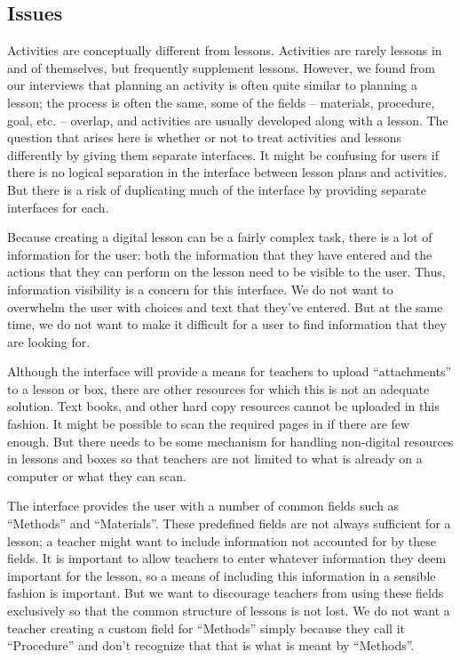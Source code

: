 \documentclass[10pt,letter,titlepage]{article}
\begin{document}
\subsection{Issues}
\label{sec: issues}
Activities are conceptually different from lessons. Activities are rarely
lessons in and of themselves, but frequently supplement lessons. However,
we found from our interviews that planning an activity is often quite similar to
planning a lesson; the process is often the same, some of the fields --
materials, procedure, goal, etc. -- overlap, and activities are usually
developed along with a lesson. The question that arises here is whether or not
to treat activities and lessons differently by giving them separate interfaces.
It might be confusing for users if there is no logical separation in the
interface between lesson plans and activities. But there is a risk of
duplicating much of the interface by providing separate interfaces for each.

Because creating a digital lesson can be a fairly complex task, there is a lot
of information for the user: both the information that they have entered and the
actions that they can perform on the lesson need to be visible to the user.
Thus, information visibility is a concern for this interface. We do not want to
overwhelm the user with choices and text that they've entered. But at the same
time, we do not want to make it difficult for a user to find information that
they are looking for.

Although the interface will provide a means for teachers to upload
``attachments'' to a lesson or box, there are other resources for which this is
not an adequate solution. Text books, and other hard copy resources cannot be
uploaded in this fashion. It might be possible to scan the required pages in if
there are few enough. But there needs to be some mechanism for handling
non-digital resources in lessons and boxes so that teachers are not limited to
what is already on a computer or what they can scan.

The interface provides the user with a number of common fields such as
``Methods'' and ``Materials''. These predefined fields are not always sufficient
for a lesson; a teacher might want to include information not accounted for by
these fields. It is important to allow teachers to enter whatever information
they deem important for the lesson, so a means of including this information in
a sensible fashion is important.  But we want to discourage teachers from using
these fields exclusively so that the common structure of lessons is not lost. We
do not want a teacher creating a custom field for ``Methods'' simply because
they call it ``Procedure'' and don't recognize that that is what is meant by
``Methods''.
\end{document}
